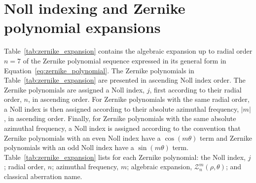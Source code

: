 \chapter{Noll indexing and Zernike polynomial expansions}
\label{app:zernike_expansion}

Table~\ref{tab:zernike_expansion} contains the algebraic expansion up to radial order $n = 7$ of the Zernike polynomial sequence expressed in its general form in Equation~\ref{eq:zernike_polynomial}. The Zernike polynomials in Table~\ref{tab:zernike_expansion} are presented in ascending Noll index order. The Zernike polynomials are assigned a Noll index, $j$, first according to their radial order, $n$, in ascending order. For Zernike polynomials with the same radial order, a Noll index is then assigned according to their absolute azimuthal frequency, $|m|$, in ascending order. Finally, for Zernike polynomials with the same absolute azimuthal frequency, a Noll index is assigned according to the convention that Zernike polynomials with an even Noll index have a $\cos(m\theta)$ term and Zernike polynomials with an odd Noll index have a $\sin(m\theta)$ term\cite{noll1976zernike}. Table~\ref{tab:zernike_expansion} lists for each Zernike polynomial: the Noll index, $j$; radial order, $n$; azimuthal frequency, $m$; algebraic expansion, $\mathcal{Z}^{m}_{n}\left(\rho,\theta\right)$; and classical aberration name.


